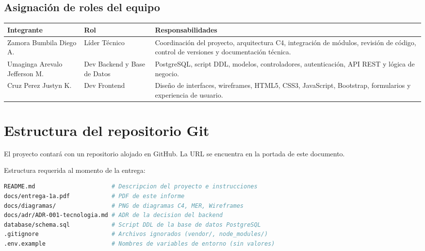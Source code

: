 \documentclass[12pt]{article}
\begin{document}
\subsection{Asignación de roles del equipo}
\begin{table}[H]
\centering
\begin{tabular}{|p{4cm}|p{3cm}|p{7cm}|}
\hline
\textbf{Integrante} & \textbf{Rol} & \textbf{Responsabilidades} \\ \hline
Zamora Bumbila Diego A. & Líder Técnico & Coordinación del proyecto, arquitectura C4, integración de módulos, revisión de código, control de versiones y documentación técnica. \\ \hline
Umaginga Arevalo Jefferson M. & Dev Backend y Base de Datos & PostgreSQL, script DDL, modelos, controladores, autenticación, API REST y lógica de negocio. \\ \hline
Cruz Perez Justyn K. & Dev Frontend & Diseño de interfaces, wireframes, HTML5, CSS3, JavaScript, Bootstrap, formularios y experiencia de usuario. \\ \hline
\end{tabular}
\end{table}

\section{Estructura del repositorio Git}
El proyecto contará con un repositorio alojado en GitHub. La URL se encuentra en la portada de este documento.

Estructura requerida al momento de la entrega:
\begin{lstlisting}[language=bash]
README.md                      # Descripcion del proyecto e instrucciones
docs/entrega-1a.pdf            # PDF de este informe
docs/diagramas/                # PNG de diagramas C4, MER, Wireframes
docs/adr/ADR-001-tecnologia.md # ADR de la decision del backend
database/schema.sql            # Script DDL de la base de datos PostgreSQL
.gitignore                     # Archivos ignorados (vendor/, node_modules/)
.env.example                   # Nombres de variables de entorno (sin valores)
\end{lstlisting}
\newpage
\end{document}
